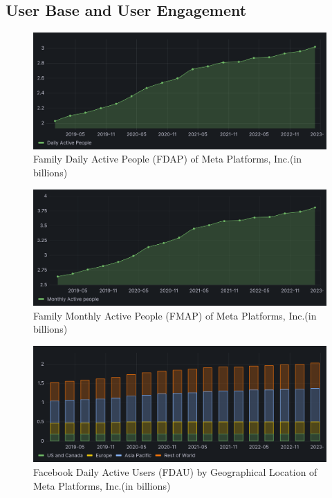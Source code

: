 \documentclass[12pt, a4paper]{article}
\begin{document}
\subsection*{User Base and User Engagement}

\begin{figure}[H]
    \centering
    \includegraphics[width=1.00\textwidth]{family-dap}
    \caption{Family Daily Active People (FDAP) of Meta Platforms, Inc.(in
    billions)\cite{2023q1,2021q2Slides,2019q4Slides}}
    \label{fig:family-dap}
\end{figure}

\begin{figure}[H]
    \centering
    \includegraphics[width=1.00\textwidth]{family-map}
    \caption{Family Monthly Active People (FMAP) of Meta Platforms, Inc.(in
    billions)\cite{2023q1,2021q2Slides,2019q4Slides}}
    \label{fig:family-map}
\end{figure}

\begin{figure}[H]
    \centering
    \includegraphics[width=1.00\textwidth]{facebook-dau}
    \caption{Facebook Daily Active Users (FDAU) by Geographical Location of Meta
    Platforms, Inc.(in billions)\cite{2023q1,2021q2Slides,2019q4Slides}}
    \label{fig:facebook-dau}
\end{figure}
\end{document}
